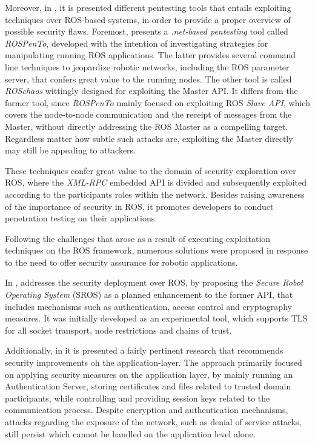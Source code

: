 Moreover, in , it is presented different pentesting tools that entails exploiting techniques over ROS-based systems, in order to provide a proper overview of possible security flaws. Foremost, \citeauthor{dieber2020penetration} presents a \textit{.net-based pentesting} tool called \textit{ROSPenTo}, developed with the intention of investigating strategies for manipulating running ROS applications. The latter provides several command line techniques to jeopardize robotic networks, including the ROS parameter server, that confers great value to the running nodes. The other tool is called \textit{ROSchaos} wittingly designed for exploiting the Master API. It differs from the former tool, since \textit{ROSPenTo} mainly focused on exploiting ROS \textit{Slave API}, which covers the node-to-node communication and the receipt of messages from the Master, without directly addressing the ROS Master as a compelling target. Regardless matter how subtle such attacks are, exploiting the Master directly may still be appealing to attackers. 

These techniques confer great value to the domain of security exploration over ROS, where the \textit{XML-RPC} embedded API is divided and subsequently exploited according to the participants roles within the network. Besides raising awareness of the importance of security in ROS, it promotes developers to conduct penetration testing on their applications.

Following the challenges that arose as a result of executing exploitation techniques on the ROS framework, numerous solutions were proposed in response to the need to offer security assurance for robotic applications. 

In , \citeauthor{white2016sros} addresses the security deployment over ROS, by proposing the \textit{Secure Robot Operating System} (SROS) as a planned enhancement to the former API, that includes mechanisms such as authentication, access control and cryptography measures. It was initially developed as an experimental tool, which supports TLS for all socket transport, node restrictions and chains of trust.  

Additionally, in  it is presented a fairly pertinent research that recommends security improvements oh the application-layer. The approach primarily focused on applying security measures on the application layer, by mainly running an Authentication Server, storing certificates and files related to trusted domain participants, while controlling and providing session keys related to the communication process. Despite encryption and authentication mechanisms, attacks regarding the exposure of the network, such as denial of service attacks, still persist which cannot be handled on the application level alone.


